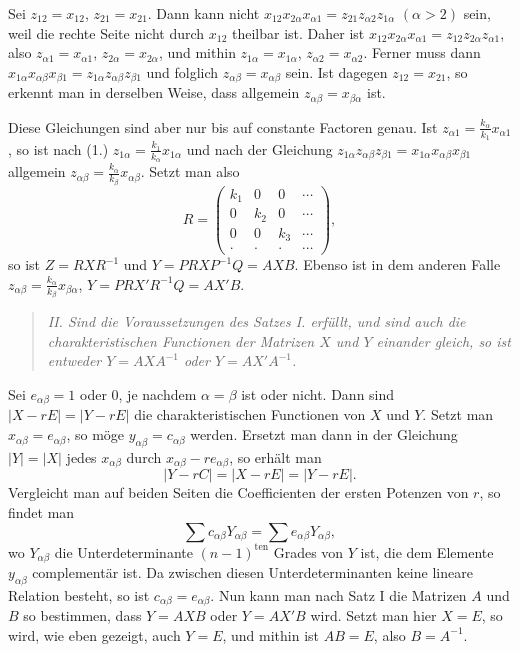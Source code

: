 \documentclass[11pt]{article}
\newcommand{\ten}{\mathrm{ten}}
\begin{document}
Sei $z_{12}=x_{12}$, $z_{21}=x_{21}$. Dann kann nicht $x_{12}x_{2\alpha}x_{\alpha1}=z_{21}z_{\alpha2}z_{1\alpha}$ $(\alpha>2)$ sein, weil die rechte Seite nicht durch $x_{12}$ theilbar ist. Daher ist $x_{12}x_{2\alpha}x_{\alpha1}=z_{12}z_{2\alpha}z_{\alpha1}$, also $z_{\alpha1}=x_{\alpha1}$, $z_{2\alpha}=x_{2\alpha}$, und mithin $z_{1\alpha}=x_{1\alpha}$, $z_{\alpha2}=x_{\alpha2}$. Ferner muss dann $x_{1\alpha}x_{\alpha\beta}x_{\beta1}=z_{1\alpha}z_{\alpha\beta}z_{\beta1}$ und folglich $z_{\alpha\beta}=x_{\alpha\beta}$ sein. Ist dagegen $z_{12}=x_{21}$, so erkennt man in derselben Weise, dass allgemein $z_{\alpha\beta}=x_{\beta\alpha}$ ist.

Diese Gleichungen sind aber nur bis auf constante Factoren genau. Ist $z_{\alpha1}=\frac{k_\alpha}{k_1}x_{\alpha1}$, so ist nach (1.) $z_{1\alpha}=\frac{k_1}{k_\alpha}x_{1\alpha}$ und nach der Gleichung $z_{1\alpha}z_{\alpha\beta}z_{\beta1}=x_{1\alpha}x_{\alpha\beta}x_{\beta1}$ allgemein $z_{\alpha\beta}=\frac{k_\alpha}{k_\beta}x_{\alpha\beta}$. Setzt man also
\[
R=\begin{pmatrix}
k_1&0&0&\cdots\\
0&k_2&0&\cdots\\
0&0&k_3&\cdots\\
\cdot&\cdot&\cdot&\cdots
\end{pmatrix},
\]
so ist $Z=RXR^{-1}$ und $Y=PRXP^{-1}Q=AXB$. Ebenso ist in dem anderen Falle $z_{\alpha\beta}=\frac{k_\alpha}{k_\beta}x_{\beta\alpha}$, $Y=PRX'R^{-1}Q=AX'B$.

\begin{quote}\itshape
II. Sind die Voraussetzungen des Satzes I. erfüllt, und sind auch die charakteristischen Functionen der Matrizen $X$ und $Y$ einander gleich, so ist entweder $Y=AXA^{-1}$ oder $Y=AX'A^{-1}$.
\end{quote}

Sei $e_{\alpha\beta}=1$ oder 0, je nachdem $\alpha=\beta$ ist oder nicht. Dann sind $|X-rE|=|Y-rE|$ die charakteristischen Functionen von $X$ und $Y$. Setzt man $x_{\alpha\beta}=e_{\alpha\beta}$, so möge $y_{\alpha\beta}=c_{\alpha\beta}$ werden. Ersetzt man dann in der Gleichung $|Y|=|X|$ jedes $x_{\alpha\beta}$ durch $x_{\alpha\beta}-re_{\alpha\beta}$, so erhält man
\[
|Y-rC|=|X-rE|=|Y-rE|.
\]
Vergleicht man auf beiden Seiten die Coefficienten der ersten Potenzen von $r$, so findet man
\[
\sum c_{\alpha\beta}Y_{\alpha\beta}=\sum e_{\alpha\beta}Y_{\alpha\beta},
\]
wo $Y_{\alpha\beta}$ die Unterdeterminante $(n-1)^{\ten}$ Grades von $Y$ ist, die dem Elemente $y_{\alpha\beta}$ complementär ist. Da zwischen diesen Unterdeterminanten keine lineare Relation besteht, so ist $c_{\alpha\beta}=e_{\alpha\beta}$. Nun kann man nach Satz I die Matrizen $A$ und $B$ so bestimmen, dass $Y=AXB$ oder $Y=AX'B$ wird. Setzt man hier $X=E$, so wird, wie eben gezeigt, auch $Y=E$, und mithin ist $AB=E$, also $B=A^{-1}$.
\end{document}
